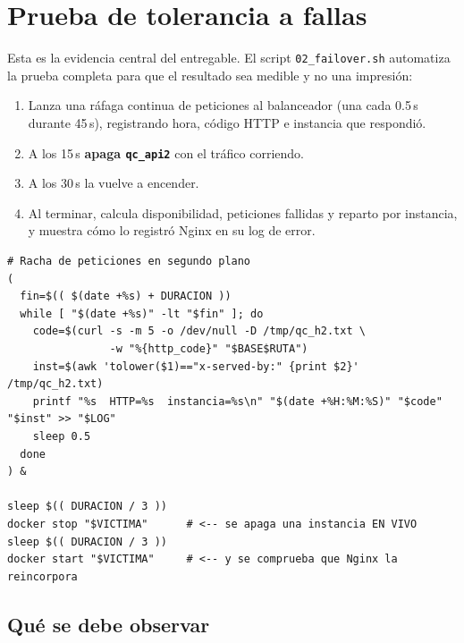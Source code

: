 \documentclass[11pt,letterpaper]{article}
\begin{document}
\section{Prueba de tolerancia a fallas}

Esta es la evidencia central del entregable. El script
\texttt{02\_failover.sh} automatiza la prueba completa para que el resultado sea
medible y no una impresión:

\begin{enumerate}[leftmargin=1.4em,itemsep=3pt]
  \item Lanza una ráfaga continua de peticiones al balanceador (una cada 0.5\,s
        durante 45\,s), registrando hora, código HTTP e instancia que respondió.
  \item A los 15\,s \textbf{apaga \texttt{qc\_api2}} con el tráfico corriendo.
  \item A los 30\,s la vuelve a encender.
  \item Al terminar, calcula disponibilidad, peticiones fallidas y reparto por
        instancia, y muestra cómo lo registró Nginx en su log de error.
\end{enumerate}

\begin{lstlisting}[style=conf,caption={\texttt{02\_failover.sh} — núcleo de la prueba.}]
# Racha de peticiones en segundo plano
(
  fin=$(( $(date +%s) + DURACION ))
  while [ "$(date +%s)" -lt "$fin" ]; do
    code=$(curl -s -m 5 -o /dev/null -D /tmp/qc_h2.txt \
                -w "%{http_code}" "$BASE$RUTA")
    inst=$(awk 'tolower($1)=="x-served-by:" {print $2}' /tmp/qc_h2.txt)
    printf "%s  HTTP=%s  instancia=%s\n" "$(date +%H:%M:%S)" "$code" "$inst" >> "$LOG"
    sleep 0.5
  done
) &

sleep $(( DURACION / 3 ))
docker stop "$VICTIMA"      # <-- se apaga una instancia EN VIVO
sleep $(( DURACION / 3 ))
docker start "$VICTIMA"     # <-- y se comprueba que Nginx la reincorpora
\end{lstlisting}

\subsection{Qué se debe observar}
\end{document}
